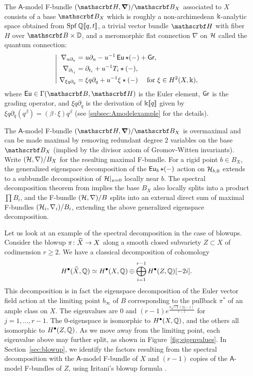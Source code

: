 \documentclass[twoside,leqno]{article}
\numberwithin{equation}{section}
\theoremstyle{plain}
\theoremstyle{definition}
\begin{document}
The $\mathsf{A}$-model F-bundle $(\omH,\bnabla)/\omB_{X}$ associated to $X$ consists of a base $\omB_{X}$ which is roughly a non-archimedean $\Bbbk$-analytic space obtained from $\operatorname{Spf}\mathbb Q[\![q,t]\!]$, a trivial vector bundle $\omH$ with fiber $H$ over $\omB\times \bbD$, and a meromorphic flat connection $\nabla$ on $\mathcal H$ called the quantum connection:
\[
\left| \ 
\begin{aligned}
    \nabla_{u\partial_u} &= u\partial_u - u^{-1}\Eu\qup(-) + \Gr,\\
    \nabla_{\partial_{t_i}} &= \partial_{t_i} + u^{-1} T_i \qup(-),\\
    \nabla_{\xi q\partial_q} &= \xi q\partial_q + u^{-1}\xi\qup(-) \quad\text{ for }\xi\in H^2(X,\bbk),
\end{aligned}
\right.
\]
where $\Eu \in \Gamma(\omB,\omH)$ is the Euler element, $\mathsf{Gr}$ is the grading operator, and $\xi q\partial_q$ is the derivation of $\Bbbk[\![q]\!]$ given by $\xi q\partial_q(q^\beta)=(\beta\cdot\xi)q^\beta$ (see \cref{subsec:Amodelexample} for the details).

The $\mathsf{A}$-model F-bundle $(\omH,\bnabla)/\omB_{X}$ is overmaximal and can be made maximal by removing redundant degree $2$ variables on the base $\omB_{X}$ (implied by the divisor axiom of Gromov-Witten invariants). Write $(\mathcal H,\nabla)/B_{X}$ for the resulting maximal F-bundle. For a rigid point $b \in B_{X}$, the generalized eigenspace decomposition of the $\operatorname{\mathsf{Eu}}_{b}\star(-)$ action on $\mathcal H_{b,0}$ extends to a subbundle decomposition of $\mathcal H|_{u=0}$ locally near $b$. The spectral decomposition theorem from \cite{HYZZ_Decomposition} implies  the base $B_{X}$ also locally splits into a product $\prod B_i$, and the F-bundle $(\mathcal H,\nabla)/B$ splits into an external direct sum of maximal F-bundles $(\mathcal H_i,\nabla_i)/B_i$, extending the above generalized eigenspace decomposition.

\medskip
Let us look at an example of the spectral decomposition in the case of blowups.
Consider the blowup $\pi\colon\widehat{X}\to X$ along a smooth closed subvariety $Z \subset X$ of codimension $r \geq 2$.
We have a classical decomposition of cohomology
\[ H^{\bullet}(\widehat{X},\mathbb Q) \simeq H^{\bullet}(X,\mathbb Q) \oplus \bigoplus_{i=1}^{r-1} H^{\bullet}(Z,\mathbb Q)[-2i].\]
This decomposition is in fact the eigenspace decomposition of the Euler vector field action at the limiting point $b_\infty$ of $B$ corresponding to the pullback $\pi^*$ of an ample class on $X$.
The eigenvalues are $0$ and $(r-1)e^{\frac{\pi \sqrt{-1}(2j-1)}{r-1}}$ for $j=1,\dots,r-1$.
The $0$-eigenspace is isomorphic to $H^{\bullet}(X,\mathbb Q)$, and the others all isomorphic to $H^{\bullet}(Z,\mathbb Q)$.
As we move away from the limiting point, each eigenvalue above may further split, as shown in Figure~\ref{fig:eigenvalues}.
In Section~\ref{sec:blowup}, we identify the factors resulting from the spectral decomposition with the $\mathsf{A}$-model F-bundle of $X$ and $(r-1)$ copies of the $\mathsf{A}$-model F-bundles of $Z$, using Iritani's blowup formula \cite{Iritani_blowup}.
\end{document}
